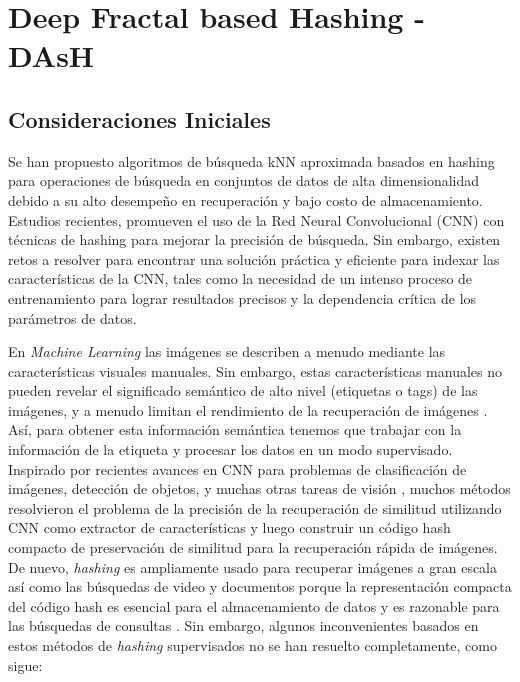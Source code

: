 \chapter{Deep Fractal based Hashing - DAsH}
 
 

\section{Consideraciones Iniciales}

Se han propuesto   algoritmos de búsqueda  kNN aproximada basados en hashing para operaciones de búsqueda en conjuntos de datos de alta dimensionalidad debido a su alto desempeño  en  recuperación y bajo costo de almacenamiento. Estudios recientes, promueven el uso de la Red Neural Convolucional (CNN) con técnicas de hashing para mejorar la precisión de búsqueda. Sin embargo, existen retos a resolver para encontrar una solución práctica y eficiente para indexar las características de la CNN, tales como la necesidad de un intenso proceso de entrenamiento para lograr resultados precisos  y la dependencia crítica de los parámetros de datos. 


En \textit{Machine Learning} las imágenes se describen a menudo mediante las características visuales manuales.  Sin embargo, estas características manuales no pueden revelar el significado semántico de alto nivel (etiquetas o tags) de las imágenes, y a menudo limitan el rendimiento de la recuperación de imágenes \cite{Li:2015:RSS:2881665.2882186}. Así, para obtener esta información semántica tenemos que trabajar con la información de la etiqueta y procesar los datos en un modo supervisado. Inspirado por recientes avances en \acf{CNN} para problemas de clasificación de imágenes, detección de objetos, y muchas otras tareas de visión \cite{ImageNet,NIPS2013_5207,LiuWJJC12}, muchos métodos resolvieron el problema de la precisión de la recuperación de similitud utilizando CNN como extractor de características y luego construir un código hash compacto de preservación de similitud para la recuperación rápida de imágenes.   De nuevo, \textit{hashing} es ampliamente usado para recuperar imágenes a gran escala así como las búsquedas de video y documentos porque la representación compacta del código hash es esencial para el almacenamiento de datos y es razonable para las búsquedas de consultas \cite{conf/cvpr/ShenSLS15}.  Sin embargo, algunos inconvenientes basados en estos métodos de \textit{hashing} supervisados no se han resuelto completamente, como sigue:


